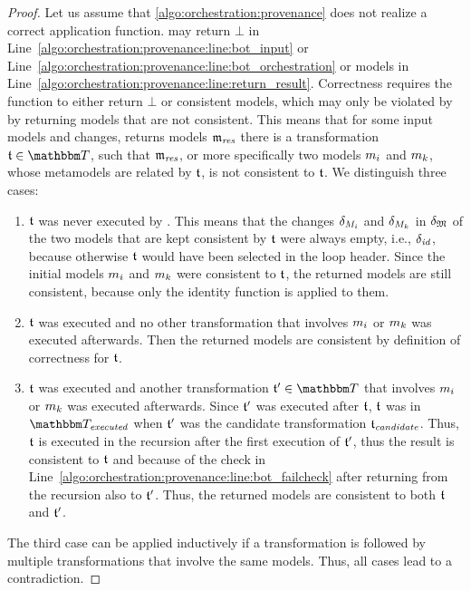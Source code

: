 \begin{proof}
    Let us assume that \autoref{algo:orchestration:provenance} does not realize a correct application function.
     may return $\bot$ in Line~\ref{algo:orchestration:provenance:line:bot_input} or Line~\ref{algo:orchestration:provenance:line:bot_orchestration} or models in Line~\ref{algo:orchestration:provenance:line:return_result}.
    Correctness requires the function to either return $\bot$ or consistent models, which may only be violated by  by returning models that are not consistent.
    This means that for some input models and changes,  returns models $\mathfrak{m}_{\mathit{res}}$ there is a transformation $\transformation{t} \in \transformationset{T}$, such that $\mathfrak{m}_{\mathit{res}}$, or more specifically two models $m_{i}$ and $m_{k}$, 
    whose metamodels are related by $\mathfrak{t}$, is not consistent to $\mathfrak{t}$.
    We distinguish three cases:
    \begin{enumerate}
        \item $\mathfrak{t}$ was never executed by . This means that the changes $\delta_{M_{i}}$ and $\delta_{M_{k}}$ in $\delta_{\mathfrak{M}}$ of the two models that are kept consistent by $\mathfrak{t}$ were always empty, i.e., $\delta_{\mathit{id}}$, because otherwise $\mathfrak{t}$ would have been selected in the loop header. Since the initial models $m_{i}$ and $m_{k}$ were consistent to $\mathfrak{t}$, the returned models are still consistent, because only the identity function is applied to them.
        \item $\mathfrak{t}$ was executed and no other transformation that involves $m_{i}$ or $m_{k}$ was executed afterwards. Then the returned models are consistent by definition of correctness for $\mathfrak{t}$.
        \item $\mathfrak{t}$ was executed and another transformation $\transformation{t}' \in \transformationset{T}$ that involves $m_{i}$ or $m_{k}$ was executed afterwards.
        Since $\mathfrak{t}'$ was executed after $\mathfrak{t}$, $\mathfrak{t}$ was in $\provalgexecuted$ when $\mathfrak{t}'$ was the candidate transformation $\mathfrak{t}_{\mathit{candidate}}$.
        Thus, $\mathfrak{t}$ is executed in the recursion after the first execution of $\mathfrak{t}'$, thus the result is consistent to $\mathfrak{t}$ and because of the check in Line~\ref{algo:orchestration:provenance:line:bot_failcheck} after returning from the recursion also to $\mathfrak{t}'$. Thus, the returned models are consistent to both $\mathfrak{t}$ and $\mathfrak{t}'$.
    \end{enumerate}
    The third case can be applied inductively if a transformation is followed by multiple transformations that involve the same models. Thus, all cases lead to a contradiction.
\end{proof}

